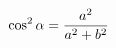 \documentclass[preview]{standalone}
\begin{document}
\begin{align*}
\special{dvisvgm:raw <g id='unique000'>}\cos^2\alpha=\dfrac{a^2}{a^2+b^2}\special{dvisvgm:raw </g>}
\end{align*}
\end{document}
